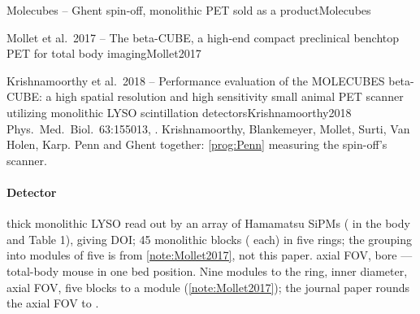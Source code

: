 \begin{programnote}{Molecubes -- Ghent spin-off, monolithic PET sold as a product}{Molecubes}
\begin{papernote}{Mollet et al.\ 2017 -- The beta-CUBE, a high-end compact preclinical benchtop PET for total body imaging}{Mollet2017}
\end{papernote}
 
\begin{papernote}{Krishnamoorthy et al.\ 2018 -- Performance evaluation of the MOLECUBES beta-CUBE: a high spatial resolution and high sensitivity small animal PET scanner utilizing monolithic LYSO scintillation detectors}{Krishnamoorthy2018}
Phys.\ Med.\ Biol.\ 63:155013, .
Krishnamoorthy, Blankemeyer, Mollet, Surti, Van Holen, Karp. Penn and Ghent
together: \ref{prog:Penn} measuring the spin-off's scanner.

\paragraph{Detector}
 thick monolithic LYSO read out by an array of 
Hamamatsu SiPMs ( in the body and Table 1), giving DOI; 45 monolithic blocks
( each) in five rings; the
grouping into modules of five is from \ref{note:Mollet2017}, not this paper.
 axial FOV,  bore --- total-body mouse in one bed position.
Nine modules to the ring,  inner diameter,  axial FOV, five
blocks to a module (\ref{note:Mollet2017}); the journal paper rounds the
axial FOV to .


\end{papernote}
\end{programnote}
